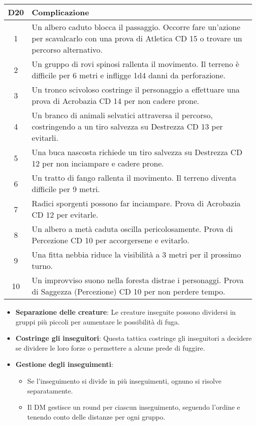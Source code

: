 \begin{longtable}{|c|p{12cm}|}
    \hline
    \textbf{D20} & \textbf{Complicazione} \\
    \hline
    1 & Un albero caduto blocca il passaggio. Occorre fare un’azione per scavalcarlo con una prova di Atletica CD 15 o trovare un percorso alternativo. \\
    2 & Un gruppo di rovi spinosi rallenta il movimento. Il terreno è difficile per 6 metri e infligge 1d4 danni da perforazione. \\
    3 & Un tronco scivoloso costringe il personaggio a effettuare una prova di Acrobazia CD 14 per non cadere prone. \\
    4 & Un branco di animali selvatici attraversa il percorso, costringendo a un tiro salvezza su Destrezza CD 13 per evitarli. \\
    5 & Una buca nascosta richiede un tiro salvezza su Destrezza CD 12 per non inciampare e cadere prone. \\
    6 & Un tratto di fango rallenta il movimento. Il terreno diventa difficile per 9 metri. \\
    7 & Radici sporgenti possono far inciampare. Prova di Acrobazia CD 12 per evitarle. \\
    8 & Un albero a metà caduta oscilla pericolosamente. Prova di Percezione CD 10 per accorgersene e evitarlo. \\
    9 & Una fitta nebbia riduce la visibilità a 3 metri per il prossimo turno. \\
    10 & Un improvviso suono nella foresta distrae i personaggi. Prova di Saggezza (Percezione) CD 10 per non perdere tempo. \\
    \hline
\end{longtable}


\begin{itemize}
    \item \textbf{Separazione delle creature}: Le creature inseguite possono dividersi in gruppi più piccoli per aumentare le possibilità di fuga.
    \item \textbf{Costringe gli inseguitori}: Questa tattica costringe gli inseguitori a decidere se dividere le loro forze o permettere a alcune prede di fuggire.
    \item \textbf{Gestione degli inseguimenti}:
    \begin{itemize}
        \item Se l'inseguimento si divide in più inseguimenti, ognuno si risolve separatamente.
        \item Il DM gestisce un round per ciascun inseguimento, seguendo l'ordine e tenendo conto delle distanze per ogni gruppo.
    \end{itemize}
\end{itemize}



